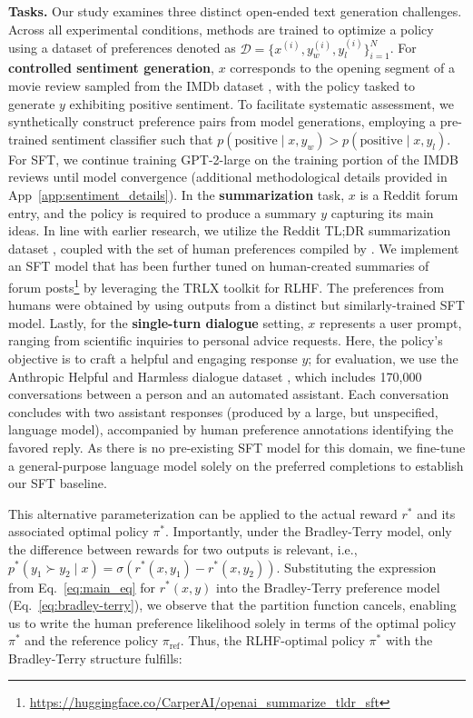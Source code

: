 \textbf{Tasks.} Our study examines three distinct open-ended text generation challenges. Across all experimental conditions, methods are trained to optimize a policy using a dataset of preferences denoted as $\mathcal{D}=\bigl\{x^{(i)}, y_w^{(i)}, y_l^{(i)}\bigr\}_{i=1}^N$. For \textbf{controlled sentiment generation}, $x$ corresponds to the opening segment of a movie review sampled from the IMDb dataset \cite{maas-EtAl:2011:ACL-HLT2011}, with the policy tasked to generate $y$ exhibiting positive sentiment. To facilitate systematic assessment, we synthetically construct preference pairs from model generations, employing a pre-trained sentiment classifier such that $p(\text{positive}\mid x,y_w)>p(\text{positive}\mid x,y_l)$. For SFT, we continue training GPT-2-large on the training portion of the IMDB reviews until model convergence (additional methodological details provided in App~\ref{app:sentiment_details}). In the \textbf{summarization} task, $x$ is a Reddit forum entry, and the policy is required to produce a summary $y$ capturing its main ideas. In line with earlier research, we utilize the Reddit TL;DR summarization dataset \citep{volske-etal-2017-tl}, coupled with the set of human preferences compiled by \citeauthor{stiennon2022learning}. We implement an SFT model that has been further tuned on human-created summaries of forum posts\footnote{\url{https://huggingface.co/CarperAI/openai_summarize_tldr_sft}} by leveraging the TRLX \citep{leandro_von_werra_2023_7790115} toolkit for RLHF. The preferences from humans were obtained by \citeauthor{stiennon2022learning} using outputs from a distinct but similarly-trained SFT model. Lastly, for the \textbf{single-turn dialogue} setting, $x$ represents a user prompt, ranging from scientific inquiries to personal advice requests. Here, the policy’s objective is to craft a helpful and engaging response $y$; for evaluation, we use the Anthropic Helpful and Harmless dialogue dataset \citep{bai2022training}, which includes 170,000 conversations between a person and an automated assistant. Each conversation concludes with two assistant responses (produced by a large, but unspecified, language model), accompanied by human preference annotations identifying the favored reply. As there is no pre-existing SFT model for this domain, we fine-tune a general-purpose language model solely on the preferred completions to establish our SFT baseline.

This alternative parameterization can be applied to the actual reward $r^*$ and its associated optimal policy $\pi^*$. Importantly, under the Bradley-Terry model, only the difference between rewards for two outputs is relevant, i.e., ${p^*(y_1 \succ y_2 \mid x) = \sigma(r^*(x, y_1) - r^*(x, y_2))}$. Substituting the expression from Eq.~\ref{eq:main_eq} for $r^*(x,y)$ into the Bradley-Terry preference model (Eq.~\ref{eq:bradley-terry}), we observe that the partition function cancels, enabling us to write the human preference likelihood solely in terms of the optimal policy $\pi^*$ and the reference policy $\pi_\text{ref}$. Thus, the RLHF-optimal policy $\pi^*$ with the Bradley-Terry structure fulfills:

